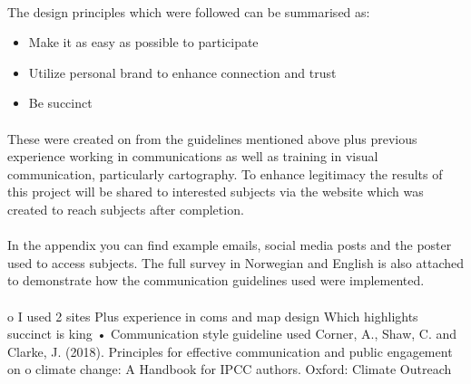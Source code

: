 \paragraph{}
The design principles which were followed can be summarised as:
\begin{itemize}
    \item Make it as easy as possible to participate
    \item Utilize personal brand to enhance connection and trust
    \item Be succinct
\end{itemize}
\paragraph{}
These were created on from the guidelines mentioned above plus previous experience working in communications as well as training in visual communication, particularly cartography. To enhance legitimacy the results of this project will be shared to interested subjects via the website which was created to reach subjects after completion. 
\paragraph{}
In the appendix you can find example emails, social media posts and the poster used to access subjects. The full survey in Norwegian and English is also attached to demonstrate how the communication guidelines used were implemented.
\paragraph{}

o	 I used 2 sites 
Plus experience in coms and map design
Which highlights succinct is king
•	Communication style guideline used
Corner, A., Shaw, C. and Clarke, J. (2018). Principles for effective communication and public engagement on
o	climate change: A Handbook for IPCC authors. Oxford: Climate Outreach 


